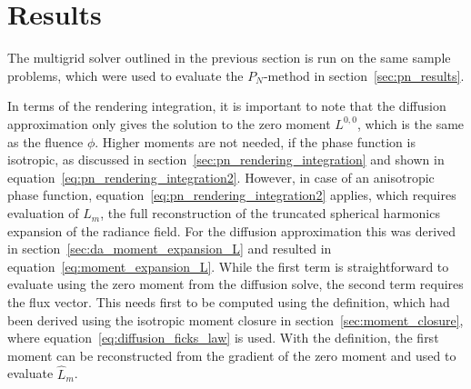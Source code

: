\section{Results}
\label{sec:da_results}

The multigrid solver outlined in the previous section is run on the same sample problems, which were used to evaluate the $P_N$-method in section~\ref{sec:pn_results}.

In terms of the rendering integration, it is important to note that the diffusion approximation only gives the solution to the zero moment $L^{0,0}$, which is the same as the fluence $\phi$. Higher moments are not needed, if the phase function is isotropic, as discussed in section~\ref{sec:pn_rendering_integration} and shown in equation~\ref{eq:pn_rendering_integration2}. However, in case of an anisotropic phase function, equation~\ref{eq:pn_rendering_integration2} applies, which requires evaluation of $\widehat{L}_m$, the full reconstruction of the truncated spherical harmonics expansion of the radiance field. For the diffusion approximation this was derived in section~\ref{sec:da_moment_expansion_L} and resulted in equation~\ref{eq:moment_expansion_L}. While the first term is straightforward to evaluate using the zero moment from the diffusion solve, the second term requires the flux vector. This needs first to be computed using the definition, which had been derived using the isotropic moment closure in section~\ref{sec:moment_closure}, where equation~\ref{eq:diffusion_ficks_law} is used. With the definition, the first moment can be reconstructed from the gradient of the zero moment and used to evaluate $\widehat{L}_m$.

